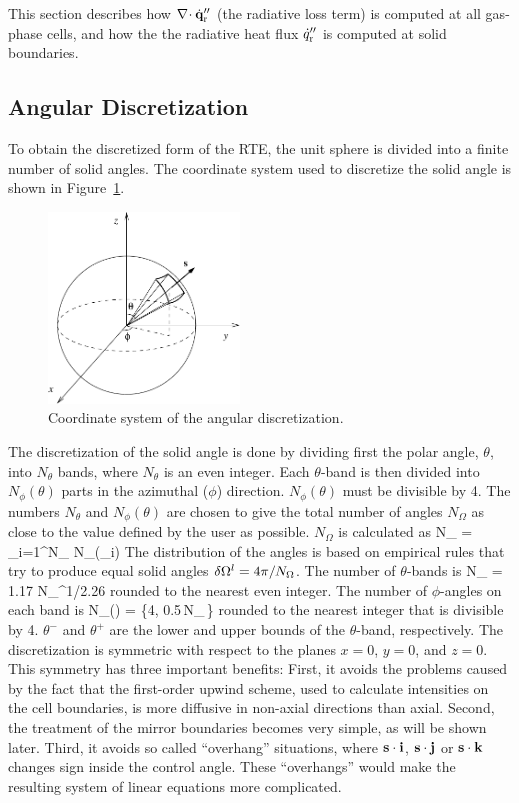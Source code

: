 This section describes how $\nabla\!\cdot \dot{\mathbf{q}}_{\rm r}''$ (the radiative loss
term) is computed at all gas-phase cells, and how the
the radiative heat flux $\dot{q}_{\rm r}''$ is computed at solid boundaries.

\subsection{Angular Discretization}
\label{radiation-discre}


To obtain the discretized form of the
RTE, the unit sphere is divided into a finite number of solid angles.
The coordinate system used to discretize the solid angle is
shown in Figure~\ref{Angular}.
\begin{figure}[ht]
\begin{center}
\includegraphics[height=2in]{FIGURES/RadCoord}
\caption{Coordinate system of the angular discretization.}
\label{Angular}
\end{center}
\end{figure}
The discretization of the solid angle is done by dividing first
the polar angle, $\theta$, into $N_{\theta}$ bands, where
$N_{\theta}$ is an even integer.
Each $\theta$-band is then divided into
$N_{\phi}(\theta)$ parts in the azimuthal ($\phi$) direction.
$N_{\phi}(\theta)$ must be divisible by 4.
The numbers $N_{\theta}$ and $N_{\phi}(\theta)$ are chosen
to give the total number of angles $N_{\Omega}$ as close to
the value defined by the user as possible.
$N_{\Omega}$ is calculated as
\be
 N_{\Omega} = \sum_{i=1}^{N_{\theta}} N_{\phi}(\theta_i)
\ee
The distribution of the angles is based on empirical rules that try
to produce equal solid angles $\delta {\Omega}^l = 4\pi/N_{\Omega}$. The
number of $\theta$-bands is
\be
 N_{\theta} = 1.17 \; N_{\Omega}^{1/2.26}
\ee
rounded to the nearest even integer. The number of $\phi$-angles
on each band is
\be
 N_{\phi}(\theta) = \max\left\{4,
        0.5\,N_{\Omega}\,\left[\cos(\theta^-)-\cos(\theta^+)\right]\right\}
\ee
rounded to the nearest integer that is divisible by 4.
$\theta^-$ and $\theta^+$ are
the lower and upper bounds of the $\theta$-band, respectively.
The discretization is symmetric with respect to the planes $x=0$, $y=0$, and
$z=0$. This symmetry has three important benefits:
First, it avoids the problems caused by the fact that the first-order
upwind scheme, used to calculate intensities on the cell boundaries,
is more diffusive in non-axial directions than axial.
Second, the treatment of the mirror boundaries becomes very simple, as
will be shown later. Third,
it avoids so called
``overhang'' situations, where ${\mathbf{s}}\cdot {\bf i}$, ${\mathbf{s}}\cdot {\bf j}$
or ${\mathbf{s}}\cdot {\bf k}$ changes sign inside
the control angle. These ``overhangs'' would make the resulting system of
linear equations more complicated.

